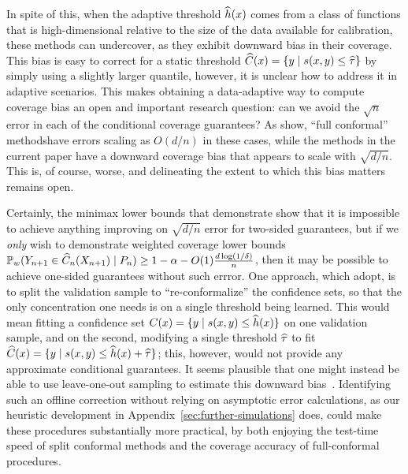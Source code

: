 \documentclass{article}
\newcommand{\scorefunc}{s}
\newcommand{\scoreval}{\scorefunc}
\begin{document}
In spite of this, when the adaptive threshold
$\widehat{h}(x)$ comes from a class of functions that is high-dimensional
relative to the size of the data available for calibration,
these methods can undercover, as they exhibit downward bias in their
coverage.
%
This bias is easy to correct for a static threshold
$\what{C}(x) = \{y \mid \scoreval(x, y) \le \what{\tau}\}$ by
simply using a slightly larger quantile, however, it is
unclear how to address it in adaptive scenarios.
%
This makes obtaining a data-adaptive way to compute coverage bias an open
and important research question: can we avoid the $\sqrt{n}$ error in each
of the conditional coverage guarantees?
%
As \citet[Thm.~2]{GibbsChCa25} show, ``full conformal''
methodshave errors scaling as $O(d/n)$ in these cases, while the methods in
the current paper have a downward coverage bias that appears to scale
with $\sqrt{d/n}$.
%
This is, of course, worse, and delineating the extent to
which this bias matters remains open.

Certainly, the minimax lower bounds that \citet{ArecesChDuKu24} demonstrate
show that it is impossible to achieve anything improving on
$\sqrt{d/n}$ error for two-sided guarantees, but if we
\emph{only} wish to demonstrate
weighted coverage lower bounds
$\mathbb{P}_w(Y_{n + 1} \in \widehat{C}_n(X_{n+1}) \mid P_n) \ge 1 - \alpha
- O(1) \frac{d \log(1/\delta)}{n}$,
then it may be possible to achieve one-sided guarantees without
such errror.
%
One approach, which \citet{CauchoisGuDu21} adopt, is to split the
validation sample to ``re-conformalize'' the confidence sets, so that the
only concentration one needs is on a single threshold being learned.
%
This would mean fitting a confidence set $C(x) = \{ y \mid \scoreval(x, y)
\le \what{h}(x)\}$ on one validation sample, and on the second, modifying a
single threshold $\widehat{\tau}$ to fit $\what{C}(x) = \{y \mid \scoreval(x,
y) \le \what{h}(x) + \what{\tau}\}$; this, however, would not provide any
approximate conditional guarantees.
%
It seems plausible that one might instead be able to use leave-one-out
sampling to estimate this downward bias~\cite{EfronSt81, BarberCaRaTi21}.
%
Identifying such an offline correction without relying on asymptotic error
calculations, as our heuristic development in
Appendix~\ref{sec:further-simulations} does, could make these procedures
substantially more practical, by both enjoying the test-time speed of split
conformal methods and the coverage accuracy of full-conformal procedures.
\end{document}
